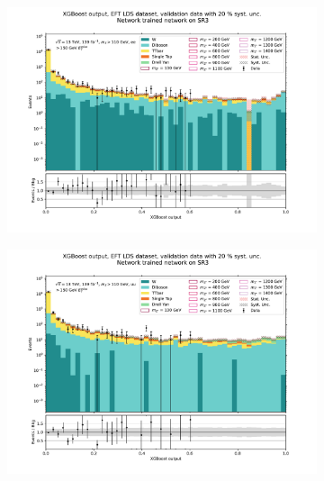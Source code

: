 \documentclass[12pt, a4paper]{book}
\begin{document}
\begin{figure}[!ht]
	\centering
	\begin{subfigure}[b]{0.49\textwidth}
      \centering
      \includegraphics[width=1\textwidth]{XGBoost/Model_independent/150/EFT_LDS/VAL_ee.pdf}
   \end{subfigure}
   \hfill
   \begin{subfigure}[b]{0.49\textwidth}
      \centering
      \includegraphics[width=1\textwidth]{XGBoost/Model_independent/150/EFT_LDS/VAL_uu.pdf}
   \end{subfigure}
   \hfill
   \begin{subfigure}[b]{0.49\textwidth}
      \centering

\end{subfigure}
\end{figure}
\end{document}
